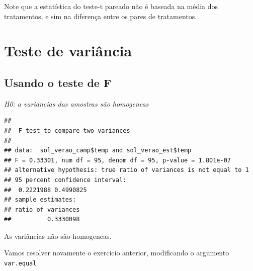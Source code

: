 \documentclass[
]{book}
\newenvironment{Shaded}{\begin{snugshade}}{\end{snugshade}}
\newcommand{\CommentTok}[1]{\textcolor[rgb]{0.56,0.35,0.01}{\textit{#1}}}
\newcommand{\DataTypeTok}[1]{\textcolor[rgb]{0.13,0.29,0.53}{#1}}
\newcommand{\FloatTok}[1]{\textcolor[rgb]{0.00,0.00,0.81}{#1}}
\newcommand{\KeywordTok}[1]{\textcolor[rgb]{0.13,0.29,0.53}{\textbf{#1}}}
\newcommand{\NormalTok}[1]{#1}
\newcommand{\OperatorTok}[1]{\textcolor[rgb]{0.81,0.36,0.00}{\textbf{#1}}}
\begin{document}
Note que a estatística do teste-t pareado não é baseada na média dos tratamentos, e sim na diferença entre os pares de tratamentos.

\hypertarget{teste-de-variuxe2ncia}{%
\section{Teste de variância}\label{teste-de-variuxe2ncia}}

\hypertarget{usando-o-teste-de-f}{%
\subsection{Usando o teste de F}\label{usando-o-teste-de-f}}

\emph{H0: a variancias das amostras são homogeneas }

\begin{Shaded}
\end{Shaded}

\begin{verbatim}
## 
##  F test to compare two variances
## 
## data:  sol_verao_camp$temp and sol_verao_est$temp
## F = 0.33301, num df = 95, denom df = 95, p-value = 1.801e-07
## alternative hypothesis: true ratio of variances is not equal to 1
## 95 percent confidence interval:
##  0.2221988 0.4990825
## sample estimates:
## ratio of variances 
##          0.3330098
\end{verbatim}

As variâncias não são homogeneas.

Vamos resolver novamente o exercicio anterior, modificando o argumento \texttt{var.equal}

\begin{Shaded}
\end{Shaded}
\end{document}
